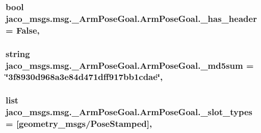 \subsubsection[{\texorpdfstring{\+\_\+has\+\_\+header}{_has_header}}]{\setlength{\rightskip}{0pt plus 5cm}bool jaco\+\_\+msgs.\+msg.\+\_\+\+Arm\+Pose\+Goal.\+Arm\+Pose\+Goal.\+\_\+has\+\_\+header = False\hspace{0.3cm}{\ttfamily [static]}, {\ttfamily [private]}}\hypertarget{classjaco__msgs_1_1msg_1_1__ArmPoseGoal_1_1ArmPoseGoal_ad017c1973333bd4cf797ad273e20c065}{}\label{classjaco__msgs_1_1msg_1_1__ArmPoseGoal_1_1ArmPoseGoal_ad017c1973333bd4cf797ad273e20c065}
\subsubsection[{\texorpdfstring{\+\_\+md5sum}{_md5sum}}]{\setlength{\rightskip}{0pt plus 5cm}string jaco\+\_\+msgs.\+msg.\+\_\+\+Arm\+Pose\+Goal.\+Arm\+Pose\+Goal.\+\_\+md5sum = \char`\"{}3f8930d968a3e84d471dff917bb1cdae\char`\"{}\hspace{0.3cm}{\ttfamily [static]}, {\ttfamily [private]}}\hypertarget{classjaco__msgs_1_1msg_1_1__ArmPoseGoal_1_1ArmPoseGoal_affaeac664a6f0db67baa332a57ef41fb}{}\label{classjaco__msgs_1_1msg_1_1__ArmPoseGoal_1_1ArmPoseGoal_affaeac664a6f0db67baa332a57ef41fb}
\subsubsection[{\texorpdfstring{\+\_\+slot\+\_\+types}{_slot_types}}]{\setlength{\rightskip}{0pt plus 5cm}list jaco\+\_\+msgs.\+msg.\+\_\+\+Arm\+Pose\+Goal.\+Arm\+Pose\+Goal.\+\_\+slot\+\_\+types = \mbox{[}\textquotesingle{}geometry\+\_\+msgs/Pose\+Stamped\textquotesingle{}\mbox{]}\hspace{0.3cm}{\ttfamily [static]}, {\ttfamily [private]}}\hypertarget{classjaco__msgs_1_1msg_1_1__ArmPoseGoal_1_1ArmPoseGoal_ae5ef79807eb2ba6fe225b7791d2a8490}{}\label{classjaco__msgs_1_1msg_1_1__ArmPoseGoal_1_1ArmPoseGoal_ae5ef79807eb2ba6fe225b7791d2a8490}


